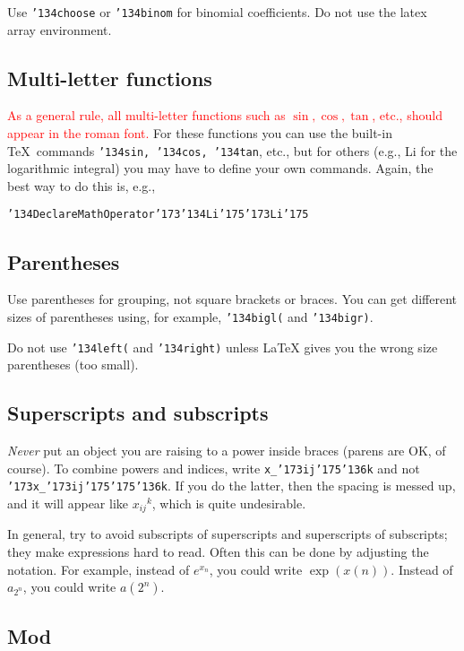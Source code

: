 \documentclass[12pt]{article}
\begin{document}
      Use {\tt\char'134choose} or {\tt\char'134binom}
for binomial coefficients.  
Do not use the latex array environment.

\subsection{Multi-letter functions}

     \textcolor{red}{As a general rule, all multi-letter functions such as $\sin, \cos, \tan$, etc., should appear in the roman font.}  For these functions you can use
the built-in \TeX\ commands {\tt\char'134sin, \char'134cos, \char'134tan}, etc.,
but for others (e.g., {\rm Li} for the logarithmic integral)
you may have to define your own commands.  Again, the best way to do this
is, e.g., 

{\tt \char'134DeclareMathOperator\char'173\char'134Li\char'175\char'173Li\char'175}

\subsection{Parentheses}

      Use parentheses for grouping, not square brackets or braces.
You can get different sizes of parentheses using, for example,
{\tt \char'134bigl(} and {\tt \char'134bigr)}.  

     Do not use {\tt \char'134left(} and {\tt \char'134right)} unless
LaTeX gives you the wrong size parentheses (too small).

\subsection{Superscripts and subscripts}

{\it Never} put an object you are raising to a power inside braces (parens
are OK, of course).
To combine powers and indices, write {\tt x\_\char'173ij\char'175\char'136k} and
not {\tt \char'173x\_\char'173ij\char'175\char'175\char'136k}.
If you do the latter, then
the spacing is messed up, and it will appear like ${x_{ij}}^k$, which
is quite undesirable.

In general, try to avoid subscripts of superscripts and superscripts of
subscripts; they make expressions hard to read.  Often this
can be done by adjusting the notation.  For example, instead of
$e^{x_n}$, you could write $\exp(x(n))$.   Instead of $a_{2^n}$, you could
write $a(2^n)$.

\subsection{Mod}
\end{document}
